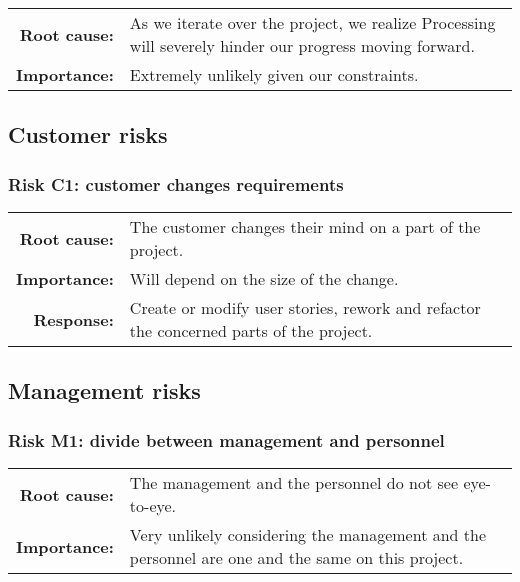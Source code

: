 \begin{tabularx}{\textwidth}{rX}
\textbf{Root cause:} & As we iterate over the project, we realize Processing will severely hinder our progress moving forward. \\
\textbf{Importance:} & Extremely unlikely given our constraints. \\
\end{tabularx}

\subsection{Customer risks}

\subsubsection{Risk C1: customer changes requirements}

\begin{tabularx}{\textwidth}{rX}
\textbf{Root cause:} & The customer changes their mind on a part of the project. \\
\textbf{Importance:} & Will depend on the size of the change. \\
\textbf{Response:} & Create or modify user stories, rework and refactor the concerned parts of the project. \\
\end{tabularx}

\subsection{Management risks}

\subsubsection{Risk M1: divide between management and personnel}

\begin{tabularx}{\textwidth}{rX}
\textbf{Root cause:} & The management and the personnel do not see eye-to-eye. \\
\textbf{Importance:} & Very unlikely considering the management and the personnel are one and the same on this project. \\
\end{tabularx}

